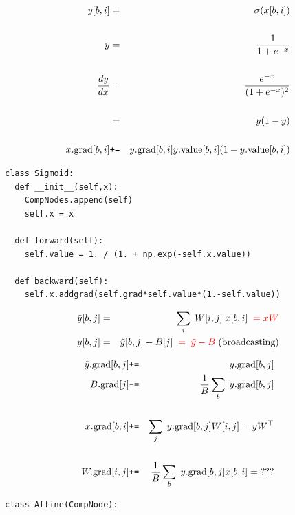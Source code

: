 {

\begin{eqnarray*}
y[b,i] & = &  \sigma(x[b,i]) \\
\\
y & = & \frac{1}{1 + e^{-x}} \\
\\
\frac{d y}{dx} & = & \frac{e^{-x}}{(1 + e^{-x})^2} \\
\\
& = & y(1-y) \\
\\
x.\mathrm{grad}[b,i] & \mbox{\tt +=} & y.\mathrm{grad}[b,i]y.\mathrm{value}[b,i](1-y.\mathrm{value}[b,i])
\end{eqnarray*}




\begin{verbatim}
class Sigmoid:
  def __init__(self,x):
    CompNodes.append(self)
    self.x = x

  def forward(self):
    self.value = 1. / (1. + np.exp(-self.x.value))

  def backward(self):
    self.x.addgrad(self.grad*self.value*(1.-self.value))
\end{verbatim}


\vspace{-3ex}
\begin{eqnarray*}
  \tilde{y}[b,j] & = & \sum_i\;W[i,j]\;x[b,i] {\color{red}\;\; = xW}  \\
  y[b,j] & = & \tilde{y}[b,j] - B[j] {\color{red} \;\;=\;\tilde{y} - B}\; \mathrm{(broadcasting)}
  \end{eqnarray*}

\vspace{-2ex}
{\color{red}
\begin{eqnarray*}
  \tilde{y}.\mathrm{grad}[b,j] &\mbox{\tt +=} & y.\mathrm{grad}[b,j] \\
  B.\mathrm{grad}[j] & \mbox{\tt -=} & \frac{1}{B} \sum_b\;y.\mathrm{grad}[b,j] \\
  \\
  x.\mathrm{grad}[b,i] & \mbox{\tt +=} & \sum_j\;y.\mathrm{grad}[b,j]W[i,j] = yW^\top\\
  \\
  W.\mathrm{grad}[i,j] & \mbox{\tt +=} & \frac{1}{B} \sum_b\;y.\mathrm{grad}[b,j]x[b,i] =\; ???
\end{eqnarray*}
}

\vfill
\eject
\begin{verbatim}
class Affine(CompNode):


\end{verbatim}}
